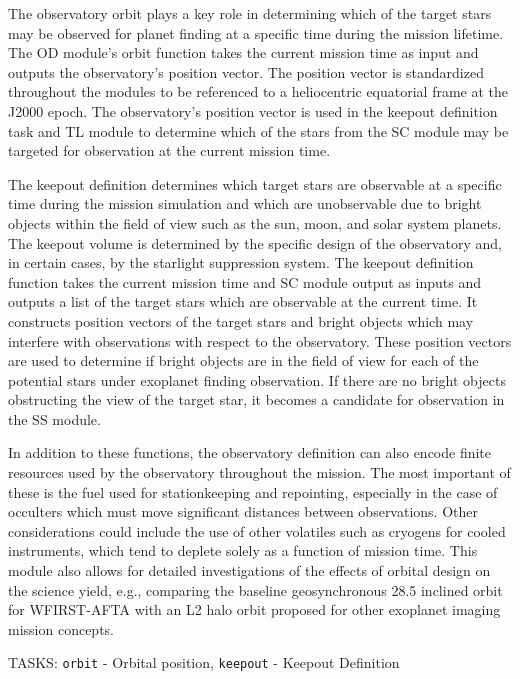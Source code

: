 \documentclass[cleanfoot]{asme2ej}
\begin{document}
The observatory orbit plays a key role in determining which of the target stars may be observed for planet finding at a specific time during the mission lifetime. The OD module's orbit function takes the current mission time as input and outputs the observatory's position vector. The position vector is standardized throughout the modules to be referenced to a heliocentric equatorial frame at the J2000 epoch. The observatory's position vector is used in the keepout definition task and TL module to determine which of the stars from the SC module may be targeted for observation at the current mission time.

The keepout definition determines which target stars are observable at a specific time during the mission simulation and which are unobservable due to bright objects within the field of view such as the sun, moon, and solar system planets.  The keepout volume is determined by the specific design of the observatory and, in certain cases, by the starlight suppression system.  The keepout definition function takes the current mission time and SC module output as inputs and outputs a list of the target stars which are observable at the current time. It constructs position vectors of the target stars and bright objects which may interfere with observations with respect to the observatory. These position vectors are used to determine if bright objects are in the field of view for each of the potential stars under exoplanet finding observation.  If there are no bright objects obstructing the view of the target star, it becomes a candidate for observation in the SS module.

In addition to these functions, the observatory definition can also encode finite resources used by the observatory throughout the mission.  The most important of these is the fuel used for stationkeeping and repointing, especially in the case of occulters which must move significant distances between observations.  Other considerations could include the use of other volatiles such as cryogens for cooled instruments, which tend to deplete solely as a function of mission time.  This module also allows for detailed investigations of the effects of orbital design on the science yield, e.g., comparing the baseline geosynchronous 28.5\textdegree{} inclined orbit for WFIRST-AFTA with an L2 halo orbit proposed for other exoplanet imaging mission concepts. 


TASKS: \verb+orbit+ - Orbital position, \verb+keepout+ - Keepout Definition
\end{document}
